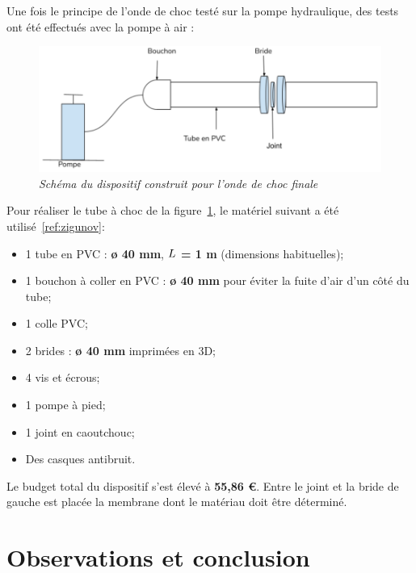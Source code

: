 \subsubsection{}
Une fois le principe de l'onde de choc testé sur la pompe hydraulique, des tests ont été effectués avec la pompe à air :
\begin{figure}[H]
	\centering
	\includegraphics[scale = 0.4]{figures/choc_air.png}
	\caption{\small{\textit{Schéma du dispositif construit pour l'onde de choc finale}}}
	\label{fig:choc_air}
\end{figure}
Pour réaliser le tube à choc de la figure~\ref{fig:choc_air}, le matériel suivant a été utilisé~\ref{ref:zigunov}:
\begin{itemize}
	\item 1 tube en PVC : \textbf{ø 40 mm}, \textbf{$\mathnormal{L}$ = 1 m} (dimensions habituelles);
	\item 1 bouchon à coller en PVC : \textbf{ø 40 mm} pour éviter la fuite d'air d'un côté du tube;
	\item 1 colle PVC;
	\item 2 brides : \textbf{ø 40 mm} imprimées en 3D;
	\item 4 vis et écrous;
	\item 1 pompe à pied;
	\item 1 joint en caoutchouc;
	\item Des casques antibruit.
\end{itemize}
Le budget total du dispositif s'est élevé à \textbf{55,86 €}.
Entre le joint et la bride de gauche est placée la membrane dont le matériau doit être déterminé. 
\section{Observations et conclusion}
